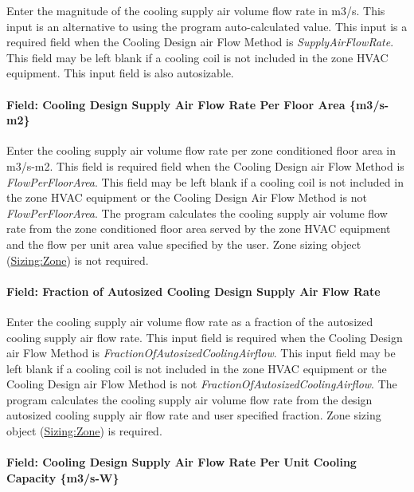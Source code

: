 Enter the magnitude of the cooling supply air volume flow rate in m3/s. This input is an alternative to using the program auto-calculated value. This input is a required field when the Cooling Design air Flow Method is \emph{SupplyAirFlowRate}. This field may be left blank if a cooling coil is not included in the zone HVAC equipment. This input field is also autosizable.

\paragraph{Field: Cooling Design Supply Air Flow Rate Per Floor Area \{m3/s-m2\}}\label{field-cooling-design-supply-air-flow-rate-per-floor-area-m3s-m2}

Enter the cooling supply air volume flow rate per zone conditioned floor area in m3/s-m2. This field is required field when the Cooling Design air Flow Method is \emph{FlowPerFloorArea}. This field may be left blank if a cooling coil is not included in the zone HVAC equipment or the Cooling Design Air Flow Method is not \emph{FlowPerFloorArea}. The program calculates the cooling supply air volume flow rate from the zone conditioned floor area served by the zone HVAC equipment and the flow per unit area value specified by the user. Zone sizing object (\hyperref[sizingzone]{Sizing:Zone}) is not required.

\paragraph{Field: Fraction of Autosized Cooling Design Supply Air Flow Rate}\label{field-fraction-of-autosized-cooling-design-supply-air-flow-rate}

Enter the cooling supply air volume flow rate as a fraction of the autosized cooling supply air flow rate. This input field is required when the Cooling Design air Flow Method is \emph{FractionOfAutosizedCoolingAirflow}. This input field may be left blank if a cooling coil is not included in the zone HVAC equipment or the Cooling Design air Flow Method is not \emph{FractionOfAutosizedCoolingAirflow}. The program calculates the cooling supply air volume flow rate from the design autosized cooling supply air flow rate and user specified fraction. Zone sizing object (\hyperref[sizingzone]{Sizing:Zone}) is required.

\paragraph{Field: Cooling Design Supply Air Flow Rate Per Unit Cooling Capacity \{m3/s-W\}}\label{field-cooling-design-supply-air-flow-rate-per-unit-cooling-capacity-m3s-w}


